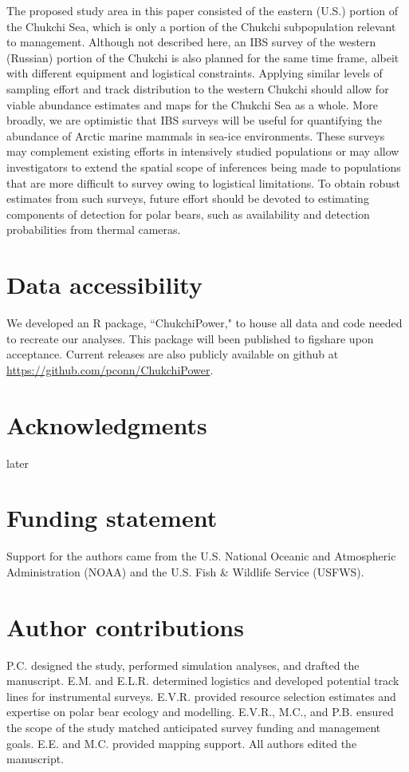 \documentclass[]{rsos}%
\begin{document}
{The proposed study area in this paper consisted of the eastern (U.S.) portion of the Chukchi Sea, which is only a portion of the Chukchi subpopulation relevant to management.  Although not described here, an IBS survey of the western (Russian) portion of the Chukchi is also planned for the same time frame, albeit with different equipment and logistical constraints.  Applying similar levels of sampling effort and track distribution to the western Chukchi should allow for viable abundance estimates and maps for the Chukchi Sea as a whole.
More broadly, we are optimistic that IBS surveys will be useful for quantifying the abundance of Arctic marine mammals in sea-ice environments. These surveys may complement existing efforts in intensively studied populations or may allow investigators to extend the spatial scope of inferences being made to populations that are more difficult to survey owing to logistical limitations.  To obtain robust estimates from such surveys, future effort should be devoted to estimating components of detection for polar bears, such as availability and detection probabilities from thermal cameras.

\section*{Data accessibility}  We developed an R package, ``ChukchiPower," to house all data and code needed to recreate our analyses.  This package will been published to figshare upon acceptance. Current releases are also publicly available on github at \url{https://github.com/pconn/ChukchiPower}.

\section*{Acknowledgments} later

\section*{Funding statement}  Support for the authors came from the U.S. National Oceanic and Atmospheric Administration (NOAA) and the U.S. Fish \& Wildlife Service (USFWS).

\section*{Author contributions}  P.C. designed the study, performed simulation analyses, and drafted the manuscript.  E.M. and E.L.R. determined logistics and developed potential track lines for instrumental surveys. E.V.R. provided resource selection estimates and expertise on polar bear ecology and modelling. E.V.R., M.C., and P.B. ensured the scope of the study matched anticipated survey funding and management goals. E.E. and M.C. provided mapping support. All authors edited the manuscript.

}
\end{document}
